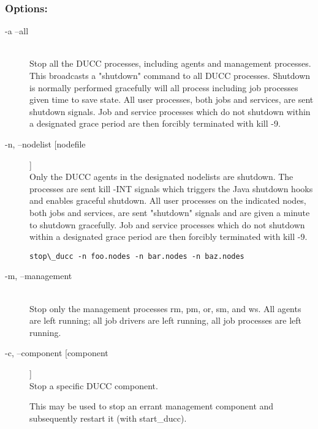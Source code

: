       \subsubsection{Options:}
        \begin{description}

          \item[-a --all] \hfill \\
            Stop all the DUCC processes, including agents and management processes. This 
            broadcasts a "shutdown" command to all DUCC processes. Shutdown is normally 
            performed gracefully will all process including job processes given time to save state. 
            All user processes, both jobs and services, are sent shutdown signals. Job and service 
            processes which do not shutdown within a designated grace period are then forcibly 
            terminated with kill -9. 
            
          \item[-n, --nodelist [nodefile]] \hfill \\
            Only the DUCC agents in the designated nodelists are shutdown. The processes are sent 
            kill -INT signals which triggers the Java shutdown hooks and enables graceful shutdown. 
            All user processes on the indicated nodes, both jobs and services, are sent "shutdown" 
            signals and are given a minute to shutdown gracefully. Job and service processes which do 
            not shutdown within a designated grace period are then forcibly terminated with kill -9. 
            
\begin{verbatim}
stop\_ducc -n foo.nodes -n bar.nodes -n baz.nodes 
\end{verbatim}

          \item[-m, --management] \hfill \\
            Stop only the management processes rm, pm, or, sm, and ws. All agents are left running; 
            all job drivers are left running, all job processes are left running. 

          \item[-c, --component [component]] \hfill \\
            Stop a specific DUCC component. 

            This may be used to stop an errant management component and subsequently restart it 
            (with start\_ducc). 
            

\end{description}
